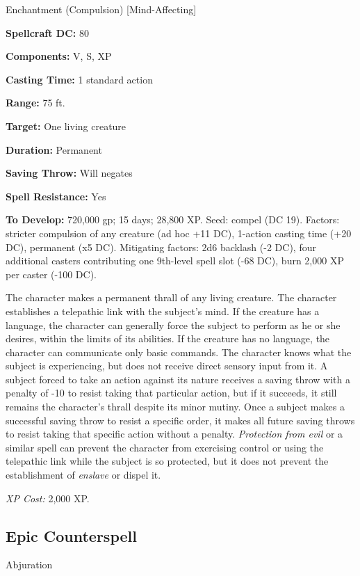 \documentclass{article}
\begin{document}
Enchantment (Compulsion) [Mind-Affecting] 

\textbf{Spellcraft DC:} 80

\textbf{Components:} V, S, XP 

\textbf{Casting Time:} 1 standard action 

\textbf{Range:} 75 ft. 

\textbf{Target:} One living creature 

\textbf{Duration:} Permanent

\textbf{Saving Throw:} Will negates 

\textbf{Spell Resistance:} Yes 

\textbf{To Develop:} 720,000 gp; 15 days; 28,800 XP. Seed: compel (DC 19). Factors: 
stricter compulsion of any creature (ad hoc +11 DC), 1-action casting time (+20 
DC), permanent (x5 DC). Mitigating factors: 2d6 backlash (-2 DC), four additional 
casters contributing one 9th-level spell slot (-68 DC), burn 2,000 XP per caster 
(-100 DC).

The character makes a permanent thrall of any living creature. The character establishes 
a telepathic link with the subject's mind. If the creature has a language, the 
character can generally force the subject to perform as he or she desires, within 
the limits of its abilities. If the creature has no language, the character can 
communicate only basic commands. The character knows what the subject is experiencing, 
but does not receive direct sensory input from it. A subject forced to take an 
action against its nature receives a saving throw with a penalty of -10 to resist 
taking that particular action, but if it succeeds, it still remains the character's 
thrall despite its minor mutiny. Once a subject makes a successful saving throw 
to resist a specific order, it makes all future saving throws to resist taking 
that specific action without a penalty. \textit{Protection from evil }or a similar 
spell can prevent the character from exercising control or using the telepathic 
link while the subject is so protected, but it does not prevent the establishment 
of \textit{enslave }or dispel it. 

\textit{XP Cost: }2,000 XP. 

\vspace{12pt}
\subsection*{Epic Counterspell }

Abjuration 
\end{document}
